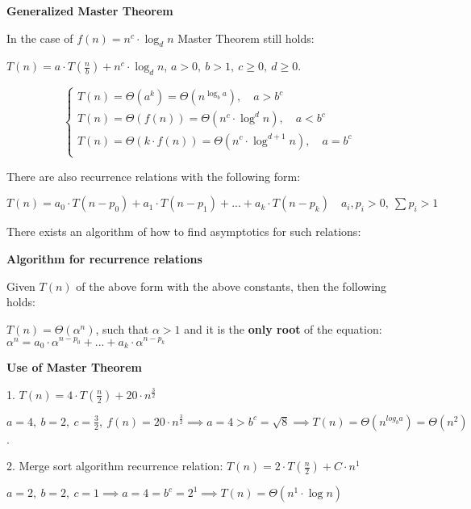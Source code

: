 
\begin{theorem}
    \textbf{Generalized Master Theorem}

    In the case of $f(n) = n^c \cdot \log_{d}{n}$ Master Theorem still holds:

    $T(n) = a \cdot T(\frac{n}{b}) + n^c \cdot \log_{d}{n}$, $a>0, \ b>1, \ c\geq 0, \ d \geq 0$.

    \begin{equation}
        \begin{cases}
            T(n) = \Theta(a^k) = \Theta(n^{\log_{b}{a}}), \quad a > b^c\\
            T(n) = \Theta(f(n)) = \Theta(n^c \cdot \log^{d}{n}), \quad a < b^c\\
            T(n) = \Theta(k \cdot f(n)) = \Theta(n^c \cdot \log^{d+1}{n}), \quad a = b^c\\
        \end{cases}
    \end{equation}

\end{theorem}



There are also recurrence relations with the following form:

$T(n) = a_0 \cdot T(n - p_0) + a_1 \cdot T(n - p_1) + ... + a_k \cdot T(n-p_k) \quad a_i, p_i > 0, \ \sum p_i > 1$

There exists an algorithm of how to find asymptotics for such relations:

\begin{theorem}
    \textbf{Algorithm for recurrence relations}

    Given $T(n)$ of the above form with the above constants, then the following holds:

    $T(n) = \Theta(\alpha^n)$, such that $\alpha > 1$ and it is the \textbf{only root} of the equation: $\alpha^n = a_0 \cdot \alpha^{n-p_0} + ... + a_k \cdot \alpha^{n-p_k}$

\end{theorem}


\begin{example}
    \textbf{Use of Master Theorem}

    1. $T(n) = 4 \cdot T(\frac{n}{2}) + 20 \cdot n^\frac{3}{2}$

    $a=4, \ b=2, \ c=\frac{3}{2}, \ f(n)=20\cdot n^\frac{3}{2} \implies a=4 > b^c=\sqrt{8} \implies T(n) = \Theta(n^{log_{b}{a}}) = \Theta(n^2)$.

    2. Merge sort algorithm recurrence relation: $T(n) = 2 \cdot T(\frac{n}{2}) + C\cdot n^1$

    $a=2, \ b=2, \ c=1 \implies a=4 = b^c=2^1 \implies T(n) = \Theta(n^1 \cdot \log{n})$

\end{example}


